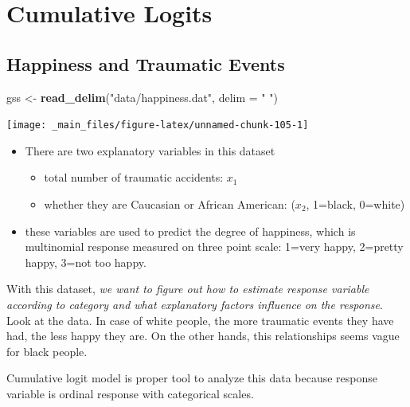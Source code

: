 \documentclass[]{book}
\newenvironment{Shaded}{\begin{snugshade}}{\end{snugshade}}
\newcommand{\DataTypeTok}[1]{\textcolor[rgb]{0.13,0.29,0.53}{#1}}
\newcommand{\KeywordTok}[1]{\textcolor[rgb]{0.13,0.29,0.53}{\textbf{#1}}}
\newcommand{\NormalTok}[1]{#1}
\newcommand{\StringTok}[1]{\textcolor[rgb]{0.31,0.60,0.02}{#1}}
\providecommand{\tightlist}{%
  \setlength{\itemsep}{0pt}\setlength{\parskip}{0pt}}
\begin{document}
\hypertarget{cumulative-logits}{%
\section{Cumulative Logits}\label{cumulative-logits}}

\hypertarget{happiness-and-traumatic-events}{%
\subsection*{Happiness and Traumatic Events}\label{happiness-and-traumatic-events}}

\begin{Shaded}
\begin{Highlighting}[]
\NormalTok{gss <-}\StringTok{ }\KeywordTok{read_delim}\NormalTok{(}\StringTok{"data/happiness.dat"}\NormalTok{, }\DataTypeTok{delim =} \StringTok{" "}\NormalTok{)}
\end{Highlighting}
\end{Shaded}

\begin{center}\texttt{[image: \_main\_files/figure-latex/unnamed-chunk-105-1]} \end{center}

\begin{itemize}
\tightlist
\item
  There are two explanatory variables in this dataset

  \begin{itemize}
  \tightlist
  \item
    total number of traumatic accidents: \(x_1\)
  \item
    whether they are Caucasian or African American: (\(x_2\), 1=black, 0=white)
  \end{itemize}
\item
  these variables are used to predict the degree of happiness, which is multinomial response measured on three point scale: 1=very happy, 2=pretty happy, 3=not too happy.
\end{itemize}

With this dataset, \emph{we want to figure out how to estimate response variable according to category and what explanatory factors influence on the response}. Look at the data. In case of white people, the more traumatic events they have had, the less happy they are. On the other hands, this relationships seems vague for black people.

Cumulative logit model is proper tool to analyze this data because response variable is ordinal response with categorical scales.
\end{document}
